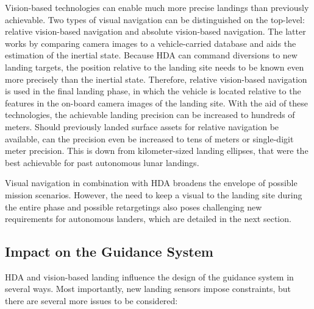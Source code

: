 \documentclass[%
]{aiaa-tc}
\begin{document}
Vision-based technologies can enable much more precise landings than previously
achievable.\cite{SanchezMontero2011} Two types of visual navigation can be
distinguished on the top-level: relative vision-based navigation and absolute
vision-based navigation.\cite{Rosa2011} The latter works by comparing camera
images to a vehicle-carried database and aids the estimation of the inertial
state.\cite{Mourikis2009} Because HDA can command diversions to new landing
targets, the position relative to the landing site needs to be known even more
precisely than the inertial state. Therefore, relative vision-based navigation
is used in the final landing phase, in which the vehicle is located relative to
the features in the on-board camera images of the landing
site.\cite{Johnson2008} With the aid of these technologies, the achievable
landing precision can be increased to hundreds of meters. Should previously
landed surface assets for relative navigation be available, can the precision
even be increased to tens of meters or single-digit meter precision. This is
down from kilometer-sized landing ellipses, that were the best achievable for
past autonomous lunar landings.\cite{Epp2007}

Visual navigation in combination with HDA broadens the envelope of possible
mission scenarios. However, the need to keep a visual to the landing site during
the entire phase and possible retargetings also poses challenging new
requirements for autonomous landers, which are detailed in the next section.


\subsection{Impact on the Guidance System}

HDA and vision-based landing influence the design of the guidance system in
several ways. Most importantly, new landing sensors impose constraints, but
there are several more issues to be considered:
\end{document}
